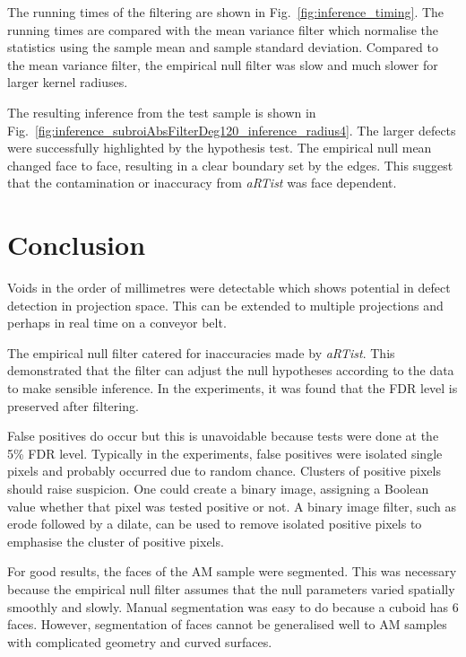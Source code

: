 \documentclass{article}
\begin{document}
The running times of the filtering are shown in Fig.~\ref{fig:inference_timing}. The running times are compared with the mean variance filter which normalise the statistics using the sample mean and sample standard deviation. Compared to the mean variance filter, the empirical null filter was slow and much slower for larger kernel radiuses.

The resulting inference from the test sample is shown in Fig.~\ref{fig:inference_subroiAbsFilterDeg120_inference_radius4}. The larger defects were successfully highlighted by the hypothesis test. The empirical null mean changed face to face, resulting in a clear boundary set by the edges. This suggest that the contamination or inaccuracy from \emph{aRTist} was face dependent.

\section{Conclusion}

Voids in the order of millimetres were detectable which shows potential in defect detection in projection space. This can be extended to multiple projections and perhaps in real time on a conveyor belt.

The empirical null filter catered for inaccuracies made by \emph{aRTist}. This demonstrated that the filter can adjust the null hypotheses according to the data to make sensible inference. In the experiments, it was found that the FDR level is preserved after filtering.

False positives do occur but this is unavoidable because tests were done at the 5\% FDR level. Typically in the experiments, false positives were isolated single pixels and probably occurred due to random chance. Clusters of positive pixels should raise suspicion. One could create a binary image, assigning a Boolean value whether that pixel was tested positive or not. A binary image filter, such as erode followed by a dilate, can be used to remove isolated positive pixels to emphasise the cluster of positive pixels.

For good results, the faces of the AM sample were segmented. This was necessary because the empirical null filter assumes that the null parameters varied spatially smoothly and slowly. Manual segmentation was easy to do because a cuboid has 6 faces. However, segmentation of faces cannot be generalised well to AM samples with complicated geometry and curved surfaces.
\end{document}
